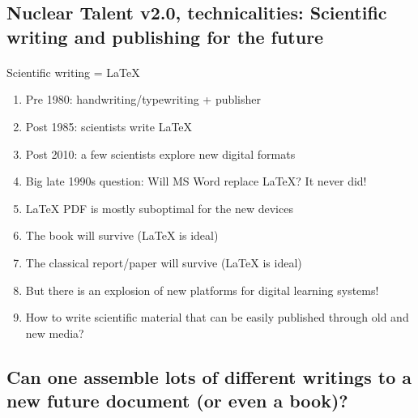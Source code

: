 \documentclass[%
oneside,                 %
final,                   %
10pt]{article}
\begin{document}
\subsection{Nuclear Talent v2.0, technicalities: Scientific writing and publishing for the future}

\paragraph{}
Scientific writing = {\LaTeX}

\begin{enumerate}
\item Pre 1980: handwriting/typewriting + publisher

\item Post 1985: scientists write {\LaTeX}

\item Post 2010: a few scientists explore new digital formats

\item Big late 1990s question: Will MS Word replace {\LaTeX}? It never did!

\item {\LaTeX} PDF is mostly suboptimal for the new devices

\item The book will survive ({\LaTeX} is ideal)

\item The classical report/paper will survive ({\LaTeX} is ideal)

\item But there is an explosion of new platforms for digital learning systems!

\item How to write scientific material that can be easily published through old and new media?
\end{enumerate}

\noindent




\subsection{Can one assemble lots of different writings to a new future document (or even a book)?}

\end{document}
